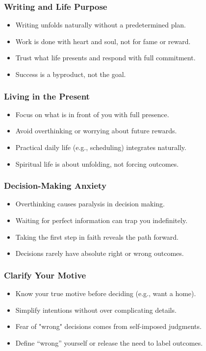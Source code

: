 \begin{frame}[fragile]\frametitle{Writing and Life Purpose}
  \begin{itemize}
    \item Writing unfolds naturally without a predetermined plan.
    \item Work is done with heart and soul, not for fame or reward.
    \item Trust what life presents and respond with full commitment.
    \item Success is a byproduct, not the goal.
  \end{itemize}
\end{frame}

\begin{frame}[fragile]\frametitle{Living in the Present}
  \begin{itemize}
    \item Focus on what is in front of you with full presence.
    \item Avoid overthinking or worrying about future rewards.
    \item Practical daily life (e.g., scheduling) integrates naturally.
    \item Spiritual life is about unfolding, not forcing outcomes.
  \end{itemize}
\end{frame}

\begin{frame}[fragile]\frametitle{Decision-Making Anxiety}
  \begin{itemize}
    \item Overthinking causes paralysis in decision making.
    \item Waiting for perfect information can trap you indefinitely.
    \item Taking the first step in faith reveals the path forward.
    \item Decisions rarely have absolute right or wrong outcomes.
  \end{itemize}
\end{frame}

\begin{frame}[fragile]\frametitle{Clarify Your Motive}
  \begin{itemize}
    \item Know your true motive before deciding (e.g., want a home).
    \item Simplify intentions without over complicating details.
    \item Fear of "wrong" decisions comes from self-imposed judgments.
    \item Define “wrong” yourself or release the need to label outcomes.
  \end{itemize}
\end{frame}

